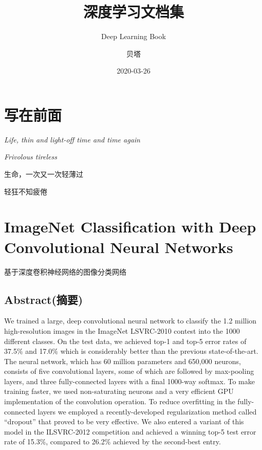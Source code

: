 \documentclass[12pt,a4paper,UTF8,twoside]{book}
\title{深度学习文档集}
\subtitle{Deep Learning Book}
\author{贝塔}
\date{2020-03-26}
\begin{document}





{
\setcounter{tocdepth}{2}
\tableofcontents
}

\hypertarget{ux5199ux5728ux524dux9762}{%
\chapter{写在前面}\label{ux5199ux5728ux524dux9762}}

\emph{Life, thin and light-off time and time again}

\emph{Frivolous tireless}

生命，一次又一次轻薄过

轻狂不知疲倦

\hypertarget{Alexnet}{%
\chapter{ImageNet Classification with Deep Convolutional Neural Networks}\label{Alexnet}}

基于深度卷积神经网络的图像分类网络

\hypertarget{abstractux6458ux8981}{%
\section{Abstract(摘要)}\label{abstractux6458ux8981}}

We trained a large, deep convolutional neural network to classify the 1.2 million high-resolution images in the ImageNet LSVRC-2010 contest into the 1000 different classes. On the test data, we achieved top-1 and top-5 error rates of 37.5\% and 17.0\% which is considerably better than the previous state-of-the-art. The neural network, which has 60 million parameters and 650,000 neurons, consists of five convolutional layers, some of which are followed by max-pooling layers, and three fully-connected layers with a final 1000-way softmax. To make training faster, we used non-saturating neurons and a very efficient GPU implementation of the convolution operation. To reduce overfitting in the fully-connected layers we employed a recently-developed regularization method called ``dropout'' that proved to be very effective. We also entered a variant of this model in the ILSVRC-2012 competition and achieved a winning top-5 test error rate of 15.3\%, compared to 26.2\% achieved by the second-best entry.
\end{document}
